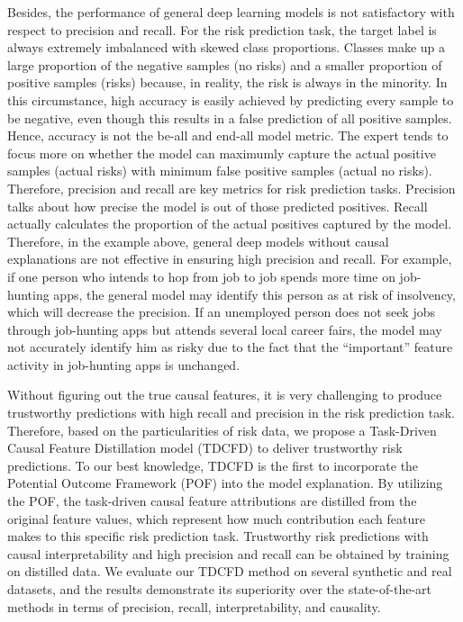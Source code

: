 \documentclass[letterpaper]{article} %
\theoremstyle{definition}
\theoremstyle{remark}
\begin{document}
Besides, the performance of general deep learning models is not satisfactory with respect to precision and recall. For the risk prediction task, the target label is always extremely imbalanced with skewed class proportions. Classes make up a large proportion of the negative samples (no risks) and a smaller proportion of positive samples (risks) because, in reality, the risk is always in the minority. In this circumstance, high accuracy is easily achieved by predicting every sample to be negative, even though this results in a false prediction of all positive samples. Hence, accuracy is not the be-all and end-all model metric. The expert tends to focus more on whether the model can maximumly capture the actual positive samples (actual risks) with minimum false positive samples (actual no risks). Therefore, precision and recall are key metrics for risk prediction tasks. Precision talks about how precise the model is out of those predicted positives. Recall actually calculates the proportion of the actual positives captured by the model. Therefore, in the example above, general deep models without causal explanations are not effective in ensuring high precision and recall. For example, if one person who intends to hop from job to job spends more time on job-hunting apps, the general model may identify this person as at risk of insolvency, which will decrease the precision. If an unemployed person does not seek jobs through job-hunting apps but attends several local career fairs, the model may not accurately identify him as risky due to the fact that the ``important'' feature activity in job-hunting apps is unchanged.

Without figuring out the true causal features, it is very challenging to produce trustworthy predictions with high recall and precision in the risk prediction task. Therefore, based on the particularities of risk data, we propose a Task-Driven Causal Feature Distillation model (TDCFD) to deliver trustworthy risk predictions. To our best knowledge, TDCFD is the first to incorporate the Potential Outcome Framework (POF) \cite{rubin1974estimating} into the model explanation. By utilizing the POF, the task-driven causal feature attributions are distilled from the original feature values, which represent how much contribution each feature makes to this specific risk prediction task. Trustworthy risk predictions with causal interpretability and high precision and recall can be obtained by training on distilled data. We evaluate our TDCFD method on several synthetic and real datasets, and the results demonstrate its superiority over the state-of-the-art methods in terms of precision, recall, interpretability, and causality.
\end{document}
